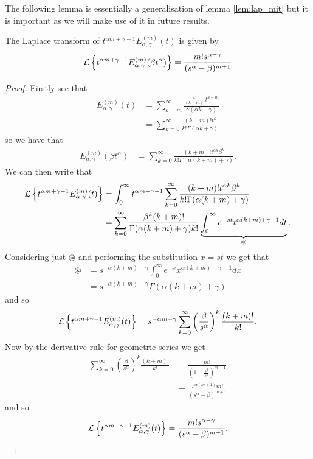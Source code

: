 The following lemma is essentially a generalisation of lemma \ref{lem:lap_mit} but it is important as we will make use of it in future results.
\begin{mdframed}[innertopmargin=10pt]
\begin{lemma}
	\label{lem:lap_mit_2}
	The Laplace transform of $ t^{\alpha m + \gamma - 1}E_{\alpha, \gamma}^{(m)}(t) $ is given by
	\begin{align*}
		\mathcal{L} \left\{  t^{\alpha m + \gamma - 1}E_{\alpha,\gamma}^{(m)} (\beta t^\alpha) \right\} = \frac{m!s^{\alpha-\gamma}}{(s^\alpha - \beta)^{m+1}}
	\end{align*}
\end{lemma}
\end{mdframed}
\begin{proof}
	Firstly see that
	\begin{align*}
		E_{\alpha,\gamma}^{(m)}(t) &= \sum_{k=m}^{\infty} \frac{\frac{k!}{(k-m)!}t^{k-m}}{\gamma(\alpha k + \gamma)} \\
			&= \sum_{k=0}^{\infty} \frac{(k+m)!t^k}{k!\Gamma(\alpha k + \gamma)}
	\end{align*}
	so we have that
	\begin{align*}
		E_{\alpha, \gamma}^{(m)}(\beta t^\alpha) &= \sum_{k=0}^{\infty} \frac{(k+m)!t^{\alpha k} \beta^k}{k! \Gamma(\alpha (k+m) + \gamma)}.
	\end{align*}
	We can then write that
	\begin{align*}
		\mathcal{L} \left\{ t^{\alpha m + \gamma - 1}E_{\alpha, \gamma}^{(m)}(t) \right\} &= \int_0^\infty t^{\alpha m + \gamma - 1}  \sum_{k=0}^{\infty} \frac{(k+m)!t^{\alpha k} \beta^k}{k! \Gamma(\alpha (k+m) + \gamma)} \\
			&= \sum_{k=0}^\infty \frac{\beta^k (k+m)!}{\Gamma(\alpha(k+m) + \gamma) k!} \underbrace{\int_0^\infty e^{-st} t^{\alpha (k+m) + \gamma - 1}dt}_{\circledast}.
	\end{align*}
	Considering just $ \circledast $ and performing the substitution $ x = st $ we get that 
	\begin{align*}
		\circledast &= s^{-\alpha(k+m) - \gamma} \int_0^\infty e^{-x} x^{\alpha (k+m) + \gamma - 1} dx \\
			&= s^{-\alpha(k+m) - \gamma} \Gamma(\alpha(k+m) + \gamma)
	\end{align*}
	and so 
	\begin{align*}
		\mathcal{L} \left\{ t^{\alpha m + \gamma - 1}E_{\alpha, \gamma}^{(m)}(t) \right\} = s^{-\alpha m - \gamma}\sum_{k=0}^\infty \left(\frac{\beta}{s^\alpha}\right)^k\frac{(k+m)!}{k!} .
	\end{align*}
	Now by the derivative rule for geometric series we get
	\begin{align*}
		\sum_{k=0}^\infty \left(\frac{\beta}{s^\alpha}\right)^k\frac{(k+m)!}{k!} &= \frac{m!}{(1-\frac{\beta}{s^\alpha})^{m+1}} \\
			&= \frac{s^{\alpha(m+1)} m!}{(s^\alpha - \beta)^{m+1}}
	\end{align*}
	and so 
	\begin{align*}
		\mathcal{L} \left\{ t^{\alpha m + \gamma - 1}E_{\alpha, \gamma}^{(m)}(t) \right\} = \frac{m!s^{\alpha-\gamma}}{(s^\alpha - \beta)^{m+1}}.
	\end{align*}
\end{proof}

